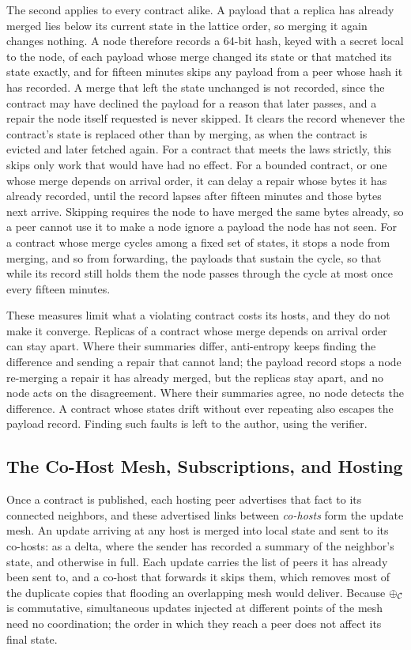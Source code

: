 The second applies to every contract alike. A payload that a replica has already merged lies below its current state in the lattice order, so merging it again changes nothing. A node therefore records a 64-bit hash, keyed with a secret local to the node, of each payload whose merge changed its state or that matched its state exactly, and for fifteen minutes skips any payload from a peer whose hash it has recorded. A merge that left the state unchanged is not recorded, since the contract may have declined the payload for a reason that later passes, and a repair the node itself requested is never skipped. It clears the record whenever the contract's state is replaced other than by merging, as when the contract is evicted and later fetched again. For a contract that meets the laws strictly, this skips only work that would have had no effect. For a bounded contract, or one whose merge depends on arrival order, it can delay a repair whose bytes it has already recorded, until the record lapses after fifteen minutes and those bytes next arrive. Skipping requires the node to have merged the same bytes already, so a peer cannot use it to make a node ignore a payload the node has not seen. For a contract whose merge cycles among a fixed set of states, it stops a node from merging, and so from forwarding, the payloads that sustain the cycle, so that while its record still holds them the node passes through the cycle at most once every fifteen minutes.

These measures limit what a violating contract costs its hosts, and they do not make it converge. Replicas of a contract whose merge depends on arrival order can stay apart. Where their summaries differ, anti-entropy keeps finding the difference and sending a repair that cannot land; the payload record stops a node re-merging a repair it has already merged, but the replicas stay apart, and no node acts on the disagreement. Where their summaries agree, no node detects the difference. A contract whose states drift without ever repeating also escapes the payload record. Finding such faults is left to the author, using the verifier.

\subsection{The Co-Host Mesh, Subscriptions, and Hosting}

Once a contract is published, each hosting peer advertises that fact to its connected neighbors, and these advertised links between \emph{co-hosts} form the update mesh. An update arriving at any host is merged into local state and sent to its co-hosts: as a delta, where the sender has recorded a summary of the neighbor's state, and otherwise in full. Each update carries the list of peers it has already been sent to, and a co-host that forwards it skips them, which removes most of the duplicate copies that flooding an overlapping mesh would deliver. Because $\oplus_{\mathcal{C}}$ is commutative, simultaneous updates injected at different points of the mesh need no coordination; the order in which they reach a peer does not affect its final state.

